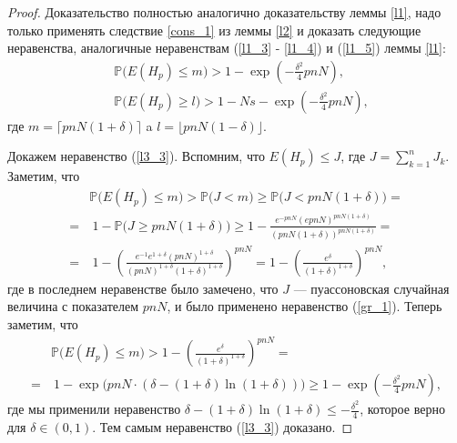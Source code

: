 \documentclass{matmex-diploma-custom}
\newcommand{\PRob}{\mathbb P}
\newcommand{\leqs}{\leqslant}
\newcommand{\geqs}{\geqslant}
\theoremstyle{named}
\begin{document}
\begin{proof}
Доказательство полностью аналогично доказательству леммы \ref{l1}, надо только применять следствие \ref{cons_1} из леммы \ref{l2}
и доказать следующие неравенства, 
аналогичные неравенствам (\ref{l1_3} - \ref{l1_4}) и (\ref{l1_5}) леммы \ref{l1}:
\begin{align} \label{l3_3}
&\PRob\big( E(H_p) \leqs m \big) > 1 - \exp\left(-\frac{\delta^2}{4}pnN\right),
\\ \label{l3_4}
&\PRob\big( E(H_p) \geqs l \big) > 1 - Ns - \exp\left(-\frac{\delta^2}{4}pnN\right),
\end{align}
где $m = \lceil pnN(1+\delta) \rceil$ a  $l = \lfloor pnN(1-\delta) \rfloor$.

Докажем неравенство (\ref{l3_3}). Вспомним, что $E(H_p) \leqs J$, где $J = \sum\limits_{k = 1}^n J_k$. Заметим, что
\begin{equation}\label{l3_5}\begin{aligned}
&\PRob\big( E(H_p) \leqs m \big) > \PRob\big( J < m \big) \geqs \PRob\big( J < pnN(1+\delta) \big) 
=
\\
= 
&~1 - \PRob\big( J \geqs pnN(1+\delta) \big) \geqs 1 - \frac{e^{-pnN}(epnN)^{pnN(1+\delta)}}{(pnN(1+\delta))^{pnN(1+\delta)}}
=
\\
=
&~1 - \left( \frac{e^{-1} e^{1+\delta}(pnN)^{1+\delta}}{(pnN)^{1+\delta}(1+\delta)^{1+\delta}} \right)^{pnN}
=
1 - \left( \frac{e^\delta}{(1+\delta)^{1+\delta}} \right)^{pnN},
\end{aligned}\end{equation}
где в последнем неравенстве было замечено, что $J$ --- пуассоновская случайная величина с показателем $pnN$, 
и было применено неравенство (\ref{gr_1}).
Теперь заметим, что 
\begin{equation}\begin{aligned}
&\PRob\big( E(H_p) \leqs m \big) > 1 - \left( \frac{e^\delta}{(1+\delta)^{1+\delta}} \right)^{pnN}
=
\\
=
&~1 - \exp\big(pnN \cdot (\delta - (1+\delta) \ln(1+\delta)) \big)
\geqs
 1 - \exp\left(-\frac{\delta^2}{4}pnN\right),
\end{aligned}\end{equation}
где мы применили неравенство $\delta - (1+\delta) \ln(1+\delta) \leqs - \frac{\delta^2}{4}$, 
которое верно для $\delta \in (0,1)$. Тем самым неравенство (\ref{l3_3}) доказано.


\end{proof}
\end{document}
